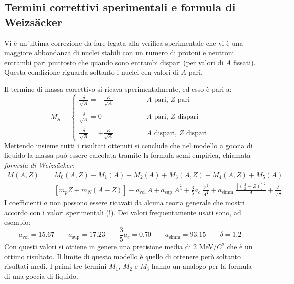 \subsection{Termini correttivi sperimentali e formula di Weizs\"{a}cker}
Vi è un'ultima correzione da fare legata alla verifica sperimentale che vi è 
una
maggiore abbondanza di nuclei stabili con un numero di protoni e neutroni
entrambi pari piuttosto che quando sono entrambi dispari (per valori di $A$
fissati). Questa condizione riguarda soltanto i nuclei con valori di $A$ pari.

Il termine di massa correttivo si ricava sperimentalmente, ed esso è pari a:
\begin{equation}
M_S = \begin{cases}
\frac{\delta}{\sqrt{A}} = -\frac{K}{\sqrt{A}} \qquad \qquad &\text{$A$ pari, 
$Z$ pari}\\
\\
\frac{\delta}{\sqrt{A}} = 0 \qquad \qquad &\text{$A$ pari, $Z$ dispari}\\
\\
\frac{\delta}{\sqrt{A}} = +\frac{K}{\sqrt{A}} \qquad \qquad &\text{$A$ dispari, 
$Z$ dispari}
\end{cases}
\end{equation}
Mettendo insieme tutti i risultati ottenuti si conclude che nel modello a goccia
di liquido la massa può essere calcolata tramite la formula semi-empirica,
chiamata \textit{formula di Weizs\"{a}cker}:
\begin{equation}
\begin{split}
M{(A, Z)} &= M_0{(A, Z)} - M_1{(A)} + M_2{(A)} + M_3{(A, Z)} + M_4{(A, Z)} + 
M_5{(A)} =\\
&= \left[ m_p Z + m_N(A-Z) \right] - a_\text{vol}\ A + a_\text{sup}\ 
A^{\frac{2}{3}} + \frac{3}{5} a_c\ \frac{Z^2}{A^{\frac{1}{3}}} + a_\text{simm}\ 
\frac{\left[ \left( \frac{A}{2} - Z \right)  \right]^2}{A} + 
\frac{\delta}{A^{\frac{1}{2}}}
\end{split}
\end{equation}
I coefficienti $a$ non possono essere ricavati da alcuna teoria generale che
mostri accordo con i valori sperimentali (!). Dei valori frequentamente usati
sono, ad esempio:
\begin{equation}
a_\text{vol} = 15.67 \qquad a_\text{sup} = 17.23 \qquad \frac{3}{5} a_c = 0.70 
\qquad a_\text{simm} = 93.15 \qquad \delta = 1.2
\end{equation}
Con questi valori si ottiene in genere una precisione media di $2$ MeV/$C^2$ che
è un ottimo risultato. Il limite di questo modello è quello di ottenere però
soltanto risultati medi. I primi tre termini $M_1$, $M_2$ e $M_3$ hanno un
analogo per la formula di una goccia di liquido.

